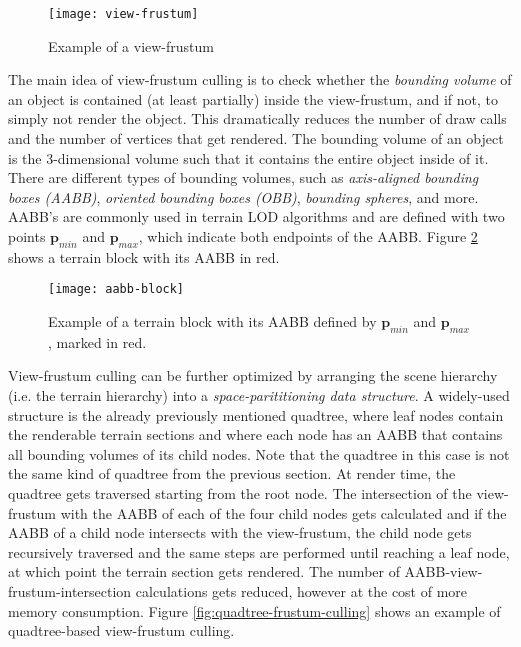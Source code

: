 \begin{figure}[H]
  \centering
  \texttt{[image: view-frustum]}
  \caption{Example of a view-frustum}\label{fig:view-frustum}
\end{figure}

The main idea of view-frustum culling is to check whether the \textit{bounding volume} of an object 
is contained (at least partially) inside the view-frustum, and if not, to simply not render the object.
This dramatically reduces the number of draw calls and the number of vertices that get rendered.
The bounding volume of an object is the 3-dimensional volume such that it contains the entire object inside of it.
There are different types of bounding volumes, such as \textit{axis-aligned bounding boxes (AABB)}, \textit{oriented bounding boxes (OBB)},
\textit{bounding spheres}, and more. AABB's are commonly used in terrain LOD algorithms \cite{geomipmapping,geomclipmaps,cdlod}
and are defined with two points $\mathbf{p}_{min}$ and $\mathbf{p}_{max}$, which indicate both endpoints of the AABB.
Figure \ref{fig:aabb-block} shows a terrain block with its AABB in red.

\begin{figure}[H]
  \centering
  \texttt{[image: aabb-block]}
  \caption{Example of a terrain block with its AABB defined by $\mathbf{p}_{min}$ and $\mathbf{p}_{max}$, marked in red.}\label{fig:aabb-block}
\end{figure}

View-frustum culling can be further optimized by arranging the scene hierarchy (i.e. the terrain hierarchy)
into a \textit{space-parititioning data structure}. A widely-used structure is the already previously mentioned quadtree, where leaf nodes contain the renderable terrain sections and where
each node has an AABB that contains all bounding volumes of its child nodes.
Note that the quadtree in this case is not the same kind of quadtree from the previous section.
At render time, the quadtree gets traversed starting from the root node.
The intersection of the view-frustum with the AABB of each of the four child nodes gets calculated
and if the AABB of a child node intersects with the view-frustum, the child node gets recursively traversed
and the same steps are performed until reaching a leaf node, at which point the terrain section gets rendered.
The number of AABB-view-frustum-intersection calculations gets reduced, however at the cost of more memory consumption.
Figure \ref{fig:quadtree-frustum-culling} shows an example of quadtree-based view-frustum culling.

